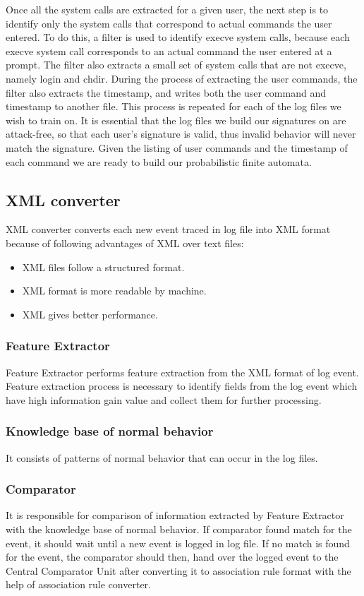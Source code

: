 \documentclass[12pt,a4paper]{report}
\begin{document}
Once all the system calls are extracted for a given user, the next step is to identify
only the system calls that correspond to actual commands the user entered. To do this, a
filter is used to identify execve system calls, because each execve system call
corresponds to an actual command the user entered at a prompt. The filter also extracts a
small set of system calls that are not execve, namely login and chdir. During the process
of extracting the user commands, the filter also extracts the timestamp, and writes both
the user command and timestamp to another file.
This process is repeated for each of the log files we wish to train on. It is essential
that the log files we build our signatures on are attack-free, so that each user's signature is
valid, thus invalid behavior will never match the signature. Given the listing of user
commands and the timestamp of each command we are ready to build our probabilistic
finite automata.
\subsection{XML converter}
XML converter converts each new event traced in log file into XML format because of following advantages of XML over text files:
\begin{itemize}
\item XML files follow a structured format.
\item XML format is more readable by machine.
\item XML gives better performance.
\end{itemize}
\subsubsection{Feature Extractor}
Feature Extractor performs feature extraction from the XML format of log event. Feature extraction process is necessary to identify fields from the log event which have high information gain value and collect them for further processing.
\subsubsection{Knowledge base of normal behavior}
It consists of patterns of normal behavior that can occur in the log files.
\subsubsection{Comparator}
It is responsible for comparison of information extracted by Feature Extractor with the knowledge base of normal behavior. If comparator found match for the event, it should wait until a new event is logged in log file. If no match is found for the event, the comparator should then, hand over the logged event to the Central Comparator Unit after converting it to association rule format with the help of association rule converter.
\end{document}

